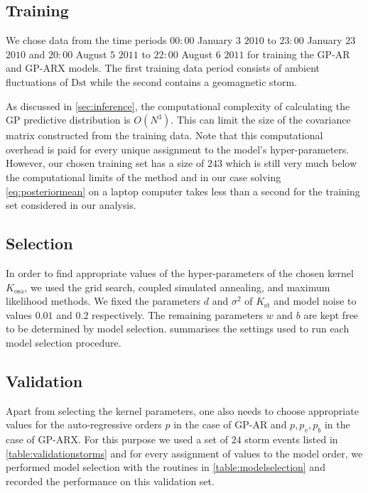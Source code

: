 \subsection*{Training}

We chose data from the time periods $00:00$ January $3$ $2010$ to $23:00$ January $23$ $2010$ and 
$20:00$ August $5$ $2011$ to $22:00$ August $6$ $2011$ for training the GP-AR and GP-ARX models. 
The first training data period consists of ambient fluctuations of $\mathrm{Dst}$ while the second 
contains a geomagnetic storm.

As discussed in \cref{sec:inference}, the computational complexity of calculating the GP predictive 
distribution is $O(N^3)$. This can limit the size of the covariance matrix constructed from the 
training data. Note that this computational overhead is paid for every unique assignment to the 
model's hyper-parameters. However, our chosen training set has a size of $243$ which is still very 
much below the computational limits of the method and in our case solving \cref{eq:posteriormean} 
on a laptop computer takes less than a second for the training set considered in our analysis. 

\subsection*{Selection}

In order to find appropriate values of the hyper-parameters of the chosen kernel $K_{\text{osa}}$, 
we used the grid search, coupled simulated annealing, and maximum likelihood methods. We fixed the 
parameters $d$ and $\sigma^2$ of $K_{\text{st}}$ and model noise to values $0.01$ and $0.2$ 
respectively. The remaining parameters $w$ and $b$ are kept free to be determined by model 
selection.  summarises the settings used to run each model selection 
procedure.

\subsection*{Validation}

Apart from selecting the kernel parameters, one also needs to choose appropriate values for the 
auto-regressive orders $p$ in the case of GP-AR and $p, p_v, p_b$ in the case of GP-ARX. For this 
purpose we used a set of $24$ storm events listed in \cref{table:validationstorms} and for every 
assignment of values to the model order, we performed model selection with the routines in 
\cref{table:modelselection} and recorded the performance on this validation set.

